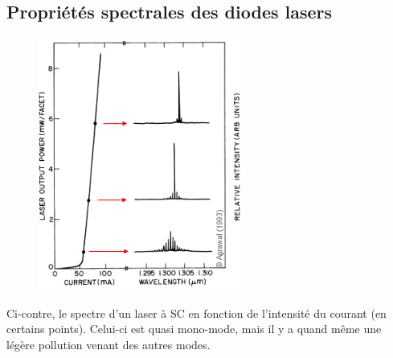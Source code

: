 	\subsection{Propriétés spectrales des diodes lasers}	
	\begin{figure}
	\vspace{-5mm}
	\includegraphics[scale=0.7]{ch5/image53}
	\end{figure}		
	Ci-contre, le spectre d'un laser à SC en fonction de l'intensité du courant (en certains points).
	Celui-ci est quasi mono-mode, mais il y a quand même une légère pollution venant des autres modes. \\

